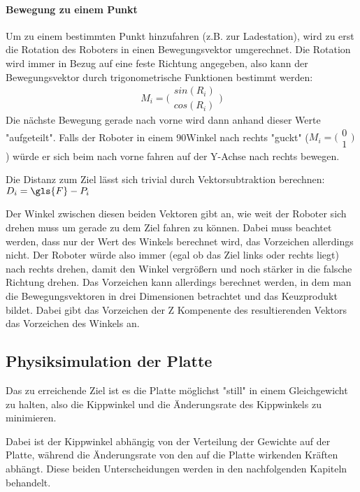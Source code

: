 \paragraph{Bewegung zu einem Punkt} Um zu einem bestimmten Punkt hinzufahren (z.B. zur Ladestation),
wird zu erst die Rotation des Roboters in einen Bewegungsvektor umgerechnet. Die Rotation wird immer in Bezug
auf eine feste Richtung angegeben, also kann der Bewegungsvektor durch trigonometrische Funktionen bestimmt werden:
\begin{equation}
\label{eq:M}
	M_i = \bigl(\begin{smallmatrix} sin(R_i) \\ cos(R_i) \end{smallmatrix}\bigr)
\end{equation}
Die n{\"{a}}chste Bewegung gerade nach vorne wird dann anhand dieser Werte "aufgeteilt". Falls der Roboter
in einem 90\textdegree Winkel nach rechts "guckt" ($M_i = \bigl(\begin{smallmatrix} 0 \\ 1 \end{smallmatrix}\bigr)$)
w{\"{u}}rde er sich beim nach vorne fahren auf der Y-Achse nach rechts bewegen.

Die Distanz zum Ziel l{\"{a}}sst sich trivial durch Vektorsubtraktion berechnen: $ D_i = \gls{F} - P_i $

Der Winkel zwischen diesen beiden Vektoren gibt an, wie weit der Roboter sich drehen muss um gerade zu dem Ziel
fahren zu k{\"{o}}nnen. Dabei muss beachtet werden, dass nur der Wert des Winkels berechnet wird, das
Vorzeichen allerdings nicht. Der Roboter w{\"{u}}rde also immer (egal ob das Ziel links oder rechts liegt) nach
rechts drehen, damit den Winkel vergr{\"{o}}{\ss}ern und noch st{\"{a}}rker in die falsche Richtung drehen.
Das Vorzeichen kann allerdings berechnet werden, in dem man die Bewegungsvektoren in drei Dimensionen betrachtet
und das Keuzprodukt bildet. Dabei gibt das Vorzeichen der Z Kompenente des resultierenden Vektors das Vorzeichen
des Winkels an.

\subsection{Physiksimulation der Platte}
Das zu erreichende Ziel ist es die Platte m{\"{o}}glichst "still" in einem Gleichgewicht zu halten, also
die Kippwinkel und die {\"{A}}nderungsrate des Kippwinkels zu minimieren.

Dabei ist der Kippwinkel abh{\"{a}}ngig von der Verteilung der Gewichte auf der Platte, w{\"{a}}hrend die
{\"{A}}nderungsrate von den auf die Platte wirkenden Kr{\"{a}}ften abh{\"{a}}ngt. Diese beiden Unterscheidungen
werden in den nachfolgenden Kapiteln behandelt.

